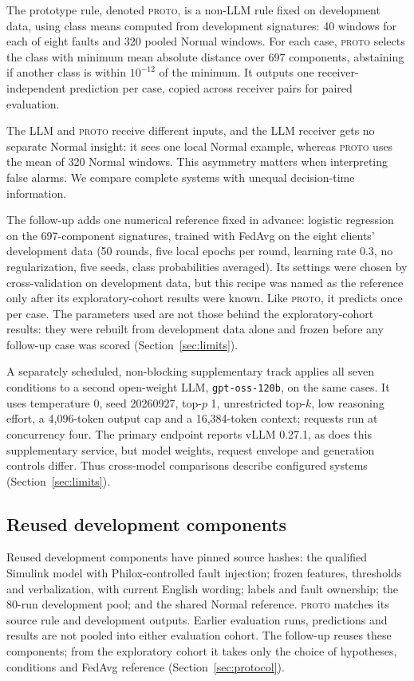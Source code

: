 \documentclass[conference]{IEEEtran}
\newcommand{\PROTO}{\textsc{proto}}
\begin{document}
The prototype rule, denoted \PROTO{}, is a non-LLM rule fixed on development data, using class means computed from development signatures: 40 windows for each of eight faults and 320 pooled Normal windows. For each case, \PROTO{} selects the class with minimum mean absolute distance over 697 components, abstaining if another class is within $10^{-12}$ of the minimum. It outputs one receiver-independent prediction per case, copied across receiver pairs for paired evaluation.

The LLM and \PROTO{} receive different inputs, and the LLM receiver gets no separate Normal insight: it sees one local Normal example, whereas \PROTO{} uses the mean of 320 Normal windows. This asymmetry matters when interpreting false alarms. We compare complete systems with unequal decision-time information.

The follow-up adds one numerical reference fixed in advance: logistic regression on the 697-component signatures, trained with FedAvg on the eight clients' development data (50 rounds, five local epochs per round, learning rate 0.3, no regularization, five seeds, class probabilities averaged). Its settings were chosen by cross-validation on development data, but this recipe was named as the reference only after its exploratory-cohort results were known. Like \PROTO{}, it predicts once per case. The parameters used are not those behind the exploratory-cohort results: they were rebuilt from development data alone and frozen before any follow-up case was scored (Section~\ref{sec:limits}).

A separately scheduled, non-blocking supplementary track applies all seven conditions to a second open-weight LLM, \texttt{gpt-oss-120b}, on the same cases. It uses temperature 0, seed 20260927, top-$p$ 1, unrestricted top-$k$, low reasoning effort, a 4,096-token output cap and a 16,384-token context; requests run at concurrency four. The primary endpoint reports vLLM 0.27.1, as does this supplementary service, but model weights, request envelope and generation controls differ. Thus cross-model comparisons describe configured systems (Section~\ref{sec:limits}).

\subsection{Reused development components}
\label{sec:provenance}
Reused development components have pinned source hashes: the qualified Simulink model with Philox-controlled fault injection; frozen features, thresholds and verbalization, with current English wording; labels and fault ownership; the 80-run development pool; and the shared Normal reference. \PROTO{} matches its source rule and development outputs. Earlier evaluation runs, predictions and results are not pooled into either evaluation cohort. The follow-up reuses these components; from the exploratory cohort it takes only the choice of hypotheses, conditions and FedAvg reference (Section~\ref{sec:protocol}).
\end{document}
